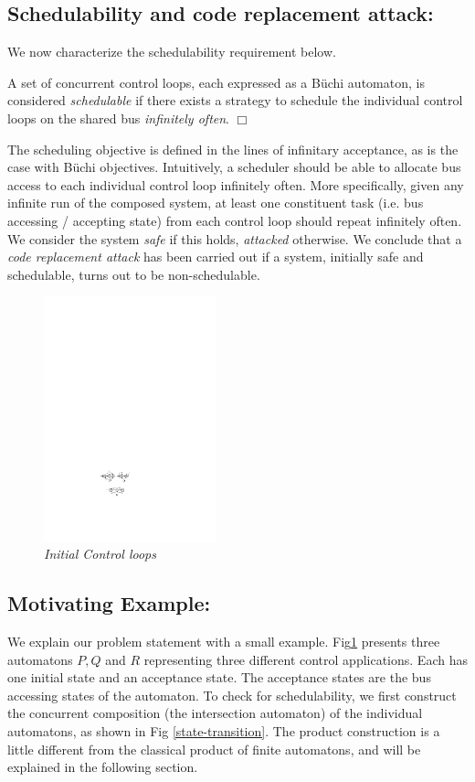 \subsection{Schedulability and code replacement attack:} 
\noindent
We now characterize the schedulability requirement below. 

\begin{definition}
A set of concurrent control loops, each expressed as a B\"{u}chi automaton, is considered {\em schedulable} if there exists a strategy to schedule the individual control loops on the shared bus {\em infinitely often}. $\Box$
\end{definition}

\noindent
The scheduling objective is defined in the lines of infinitary acceptance, as is the case with B\"{u}chi objectives. Intuitively, a scheduler should be able to allocate bus access to each individual control loop infinitely often. More specifically, given any infinite run of the composed system, at least one constituent task (i.e. bus accessing / accepting state) from each control loop should repeat infinitely often. We consider the system {\em safe} if this holds, {\em attacked} otherwise. We conclude that a {\em code replacement attack} has been carried out if a system,  initially safe and schedulable, turns out to be non-schedulable. 

\begin{figure}
\begin{center}
\includegraphics[width=50mm]{original.pdf}
\end{center}
\caption{{\em Initial Control loops}}
\label{state}
\end{figure}

\subsection{Motivating Example:}
\noindent
We explain our problem statement with a small example. Fig\ref{state} presents three automatons $P,Q$ and $R$ representing three different control applications.
Each has one initial state and an acceptance state. The acceptance states are the bus accessing states
of the automaton. To check for schedulability, we first construct the concurrent composition (the intersection automaton) of the individual automatons, as shown in Fig \ref{state-transition}. The product construction is a little different from the classical product of finite automatons, and will be explained in the following section. \\ 

